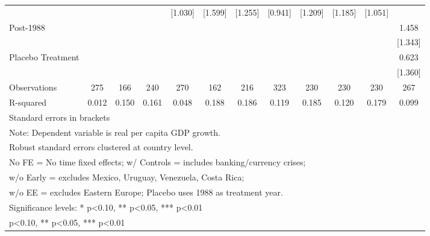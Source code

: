 \begin{table}[htbp]
\begin{tabular}{l*{11}{c}}
                &            &            &            &  [1.030]   &  [1.599]   &  [1.255]   &  [0.941]   &  [1.209]   &  [1.185]   &  [1.051]   &            \\
Post-1988       &            &            &            &            &            &            &            &            &            &            &    1.458   \\
                &            &            &            &            &            &            &            &            &            &            &  [1.343]   \\
Placebo Treatment&            &            &            &            &            &            &            &            &            &            &    0.623   \\
                &            &            &            &            &            &            &            &            &            &            &  [1.360]   \\
\midrule
Observations    &      275   &      166   &      240   &      270   &      162   &      216   &      323   &      230   &      230   &      230   &      267   \\
R-squared       &    0.012   &    0.150   &    0.161   &    0.048   &    0.188   &    0.186   &    0.119   &    0.185   &    0.120   &    0.179   &    0.099   \\
\bottomrule
\multicolumn{12}{l}{\footnotesize Standard errors in brackets}\\
\multicolumn{12}{l}{\footnotesize Note: Dependent variable is real per capita GDP growth.}\\
\multicolumn{12}{l}{\footnotesize Robust standard errors clustered at country level.}\\
\multicolumn{12}{l}{\footnotesize No FE = No time fixed effects; w/ Controls = includes banking/currency crises;}\\
\multicolumn{12}{l}{\footnotesize w/o Early = excludes Mexico, Uruguay, Venezuela, Costa Rica;}\\
\multicolumn{12}{l}{\footnotesize w/o EE = excludes Eastern Europe; Placebo uses 1988 as treatment year.}\\
\multicolumn{12}{l}{\footnotesize Significance levels: * p<0.10, ** p<0.05, *** p<0.01}\\
\multicolumn{12}{l}{\footnotesize * p<0.10, ** p<0.05, *** p<0.01}\\
\end{tabular}
\end{table}
